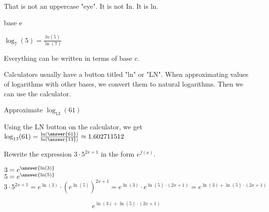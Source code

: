 \documentclass{ximera}
\begin{document}
That is not an uppercase "eye".  It is not In.  It is ln.





\begin{example}  base e


$\log_7(5) = \frac{ln(5)}{\ln(7)}$


\end{example}
Everything can be written in terms of base $e$.


Calculators usually have a button titled "ln" or "LN".  When approximating values of logarithms with other bases, we convert them to natural logarithms.  Then we can use the calculator.









\begin{example}  


Approximate $\log_{13}(61)$


\begin{explanation}


Using the LN button on the calculator, we get $\log_{13}(61) = \frac{\ln\left(\answer{61}\right)}{\ln\left(\answer{13}\right)} \approx 1.602711512$
\end{explanation}
\end{example}








\begin{example}  


Rewrite the expression $3 \cdot 5^{2x + 1}$ in the form $e^{f(x)}$.


\begin{explanation}


$3 = e^{\answer{\ln(3)}}$ \\


$5 = e^{\answer{\ln(5)}}$ \\


\[   3 \cdot 5^{2x + 1} = e^{\ln(3)} \cdot (e^{\ln(5)})^{2x + 1}  =  e^{\ln(3)} \cdot e^{\ln(5) \cdot (2x + 1)}  = e^{\ln(3) + \ln(5) \cdot (2x + 1)} \]


\[  e^{\ln(3) + \ln(5) \cdot (2x + 1)} \] 

\end{explanation}
\end{example}
\end{document}
